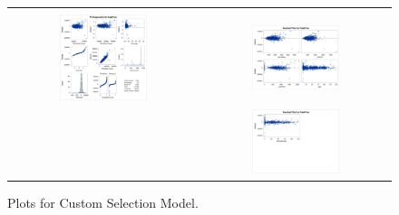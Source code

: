 \documentclass[11pt]{scrartcl} %
\begin{document}
\begin{figure}[H] %
	\centering
	\begin{tabular}{p{} p{}}
	\hline
	\multicolumn{1}{|c}{} &  \multicolumn{1}{c|}{} \\
		\multicolumn{1}{|c}{\includegraphics[width=0.48\textwidth]{../graphics/A2CustAss1}} &
		\multicolumn{1}{c|}{\includegraphics[width=0.48\textwidth]{../graphics/A2CustAss2}}\\
		& \multicolumn{1}{c|}{\includegraphics[width=0.48\textwidth]{../graphics/A2CustAss3}}\\
		\hline
	\end{tabular}		
	\caption{Plots for Custom Selection Model.}
	\label{fig:A2CustomAss}
\end{figure}
\end{document}
